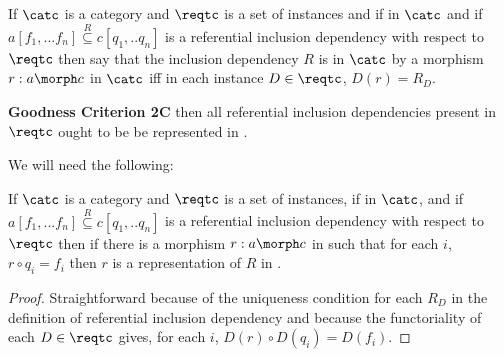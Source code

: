 \begin{definition}
If $\catc$ is a category and $\reqtc$ is a set of instances and if
\fnsourceqnsource
in $\catc$ and if $a[f_1,...f_n] \overset{R}{\subseteq} c[q_1,..q_n]$ is a referential inclusion dependency
with respect  to $\reqtc$ then say that the inclusion dependency $R$ is  in $\catc$ by a  morphism $r:a \morph c$ in $\catc$
iff in each instance $D \in \reqtc$, $D(r) = R_D$. 
\end{definition}

\textbf {Goodness Criterion 2C} \IfSforCwithRCwords 
then all referential inclusion dependencies present in $\reqtc$
ought to be be represented in \catcp.

We will need the following:
\begin{lemma}
\label{catRefIncSublemma}
If $\catc$ is a category and $\reqtc$ is a set of instances,
if \fnsourceqnsource in $\catc$, 
and if $a[f_1,...f_n] \overset{R}{\subseteq} c[q_1,..q_n]$ 
is a referential inclusion dependency with respect to $\reqtc$ 
then if there is a morphism $r: a \morph c$ in \catcw 
such that for each $i$, $r \circ q_i = f_i$ 
then $r$ is a representation of $R$  in  \catc. 
\end{lemma}
\begin{proof} Straightforward because of the uniqueness condition for each $R_D$ in the definition of referential inclusion dependency and because the functoriality of each $D \in \reqtc$ gives, 
for each $i$, $D(r) \circ D(q_i) = D(f_i)$.
\end{proof}
